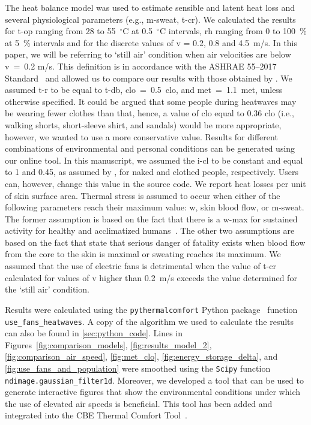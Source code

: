 The heat balance model was used to estimate sensible and latent heat loss and several physiological parameters (e.g., \ac{m-sweat}, \ac{t-cr}).
We calculated the results for \ac{t-op} ranging from 28 to 55~$^{\circ}$C at 0.5~$^{\circ}$C intervals, \ac{rh} ranging from 0 to 100~\% at 5~\% intervals and for the discrete values of \ac{v} = 0.2, 0.8 and 4.5~m/s.
In this paper, we will be referring to `still air' condition when air velocities are below \ac{v}~=~0.2 m/s.
This definition is in accordance with the ASHRAE 55--2017 Standard~\cite{ashrae552017} and allowed us to compare our results with those obtained by .
We assumed \ac{t-r} to be equal to \ac{t-db}, \ac{clo}~=~0.5~clo, and \ac{met}~=~1.1~met, unless otherwise specified.
It could be argued that some people during heatwaves may be wearing fewer clothes than that, hence, a value of \ac{clo} equal to 0.36 clo (i.e., walking shorts, short-sleeve shirt, and sandals) would be more appropriate, however, we wanted to use a more conservative value.
Results for different combinations of environmental and personal conditions can be generated using our online tool.
In this manuscript, we assumed the \ac{i-cl} to be constant and equal to 1 and 0.45, as assumed by , for naked and clothed people, respectively.
Users can, however, change this value in the source code.
We report heat losses per unit of skin surface area.
Thermal stress is assumed to occur when either of the following parameters reach their maximum value: \ac{w}, skin blood flow, or \ac{m-sweat}.
The former assumption is based on the fact that there is a \ac{w-max} for sustained activity for healthy and acclimatized humans~\cite{ASHRA2017}.
The other two assumptions are based on the fact that  state that serious danger of fatality exists when blood flow from the core to the skin is maximal or sweating reaches its maximum.
We assumed that the use of electric fans is detrimental when the value of \ac{t-cr} calculated for values of \ac{v} higher than 0.2~m/s exceeds the value determined for the `still air' condition.

Results were calculated using the  \verb|pythermalcomfort| Python package~\cite{Tartarini2020a} function \verb|use_fans_heatwaves|.
A copy of the algorithm we used to calculate the results can also be found in \ref{sec:python_code}.
Lines in Figures~\ref{fig:comparison_models}, \ref{fig:results_model_2}, \ref{fig:comparison_air_speed}, \ref{fig:met_clo}, \ref{fig:energy_storage_delta}, and \ref{fig:use_fans_and_population} were smoothed using the \verb|Scipy| function \verb|ndimage.gaussian_filter1d|.
Moreover, we developed a tool that can be used to generate interactive figures that show the environmental conditions under which the use of elevated air speeds is beneficial.
This tool has been added and integrated into the CBE Thermal Comfort Tool~\cite{Tartarini2020}.

